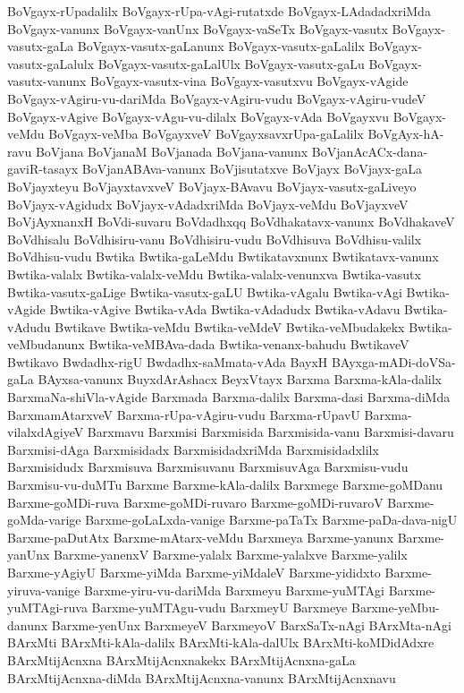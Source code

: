 {BoVgayx-rUpadalilx
BoVgayx-rUpa-vAgi-rutatxde
BoVgayx-LAdadadxriMda
BoVgayx-vanunx
BoVgayx-vanUnx
BoVgayx-vaSeTx
BoVgayx-vasutx
BoVgayx-vasutx-gaLa
BoVgayx-vasutx-gaLanunx
BoVgayx-vasutx-gaLalilx
BoVgayx-vasutx-gaLalulx
BoVgayx-vasutx-gaLalUlx
BoVgayx-vasutx-gaLu
BoVgayx-vasutx-vanunx
BoVgayx-vasutx-vina
BoVgayx-vasutxvu
BoVgayx-vAgide
BoVgayx-vAgiru-vu-dariMda
BoVgayx-vAgiru-vudu
BoVgayx-vAgiru-vudeV
BoVgayx-vAgive
BoVgayx-vAgu-vu-dilalx
BoVgayx-vAda
BoVgayxvu
BoVgayx-veMdu
BoVgayx-veMba
BoVgayxveV
BoVgayxsavxrUpa-gaLalilx
BoVgAyx-hA-ravu
BoVjana
BoVjanaM
BoVjanada
BoVjana-vanunx
BoVjanAcACx-dana-gaviR-tasayx
BoVjanABAva-vanunx
BoVjisutatxve
BoVjayx
BoVjayx-gaLa
BoVjayxteyu
BoVjayxtavxveV
BoVjayx-BAvavu
BoVjayx-vasutx-gaLiveyo
BoVjayx-vAgidudx
BoVjayx-vAdadxriMda
BoVjayx-veMdu
BoVjayxveV
BoVjAyxnanxH
BoVdi-suvaru
BoVdadhxqq
BoVdhakatavx-vanunx
BoVdhakaveV
BoVdhisalu
BoVdhisiru-vanu
BoVdhisiru-vudu
BoVdhisuva
BoVdhisu-valilx
BoVdhisu-vudu
Bwtika
Bwtika-gaLeMdu
Bwtikatavxnunx
Bwtikatavx-vanunx
Bwtika-valalx
Bwtika-valalx-veMdu
Bwtika-valalx-venunxva
Bwtika-vasutx
Bwtika-vasutx-gaLige
Bwtika-vasutx-gaLU
Bwtika-vAgalu
Bwtika-vAgi
Bwtika-vAgide
Bwtika-vAgive
Bwtika-vAda
Bwtika-vAdadudx
Bwtika-vAdavu
Bwtika-vAdudu
Bwtikave
Bwtika-veMdu
Bwtika-veMdeV
Bwtika-veMbudakekx
Bwtika-veMbudanunx
Bwtika-veMBAva-dada
Bwtika-venanx-bahudu
BwtikaveV
Bwtikavo
Bwdadhx-rigU
Bwdadhx-saMmata-vAda
BayxH
BAyxga-mADi-doVSa-gaLa
BAyxsa-vanunx
BuyxdArAshacx
BeyxVtayx
Barxma
Barxma-kAla-dalilx
BarxmaNa-shiVla-vAgide
Barxmada
Barxma-dalilx
Barxma-dasi
Barxma-diMda
BarxmamAtarxveV
Barxma-rUpa-vAgiru-vudu
Barxma-rUpavU
Barxma-vilalxdAgiyeV
Barxmavu
Barxmisi
Barxmisida
Barxmisida-vanu
Barxmisi-davaru
Barxmisi-dAga
Barxmisidadx
BarxmisidadxriMda
Barxmisidadxlilx
Barxmisidudx
Barxmisuva
Barxmisuvanu
BarxmisuvAga
Barxmisu-vudu
Barxmisu-vu-duMTu
Barxme
Barxme-kAla-dalilx
Barxmege
Barxme-goMDanu
Barxme-goMDi-ruva
Barxme-goMDi-ruvaro
Barxme-goMDi-ruvaroV
Barxme-goMda-varige
Barxme-goLaLxda-vanige
Barxme-paTaTx
Barxme-paDa-dava-nigU
Barxme-paDutAtx
Barxme-mAtarx-veMdu
Barxmeya
Barxme-yanunx
Barxme-yanUnx
Barxme-yanenxV
Barxme-yalalx
Barxme-yalalxve
Barxme-yalilx
Barxme-yAgiyU
Barxme-yiMda
Barxme-yiMdaleV
Barxme-yididxto
Barxme-yiruva-vanige
Barxme-yiru-vu-dariMda
Barxmeyu
Barxme-yuMTAgi
Barxme-yuMTAgi-ruva
Barxme-yuMTAgu-vudu
BarxmeyU
Barxmeye
Barxme-yeMbu-danunx
Barxme-yenUnx
BarxmeyeV
BarxmeyoV
BarxSaTx-nAgi
BArxMta-nAgi
BArxMti
BArxMti-kAla-dalilx
BArxMti-kAla-dalUlx
BArxMti-koMDidAdxre
BArxMtijAcnxna
BArxMtijAcnxnakekx
BArxMtijAcnxna-gaLa
BArxMtijAcnxna-diMda
BArxMtijAcnxna-vanunx
BArxMtijAcnxnavu
}
